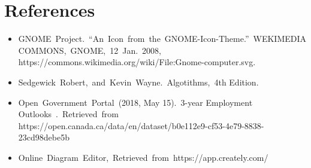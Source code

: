 \documentclass[12pt]{article}
\begin{document}
\section{References}
\begin{itemize}
\item GNOME\ Project.\ “An\ Icon\ from\ the\ GNOME-Icon-Theme.”\ WEKIMEDIA\\ COMMONS,\ GNOME,\ 12\ Jan.\ 2008, https://commons.wikimedia.org/wiki/File:Gnome-computer.svg.
\item Sedgewick\ Robert,\ and\ Kevin\ Wayne.\ Algotithms,\ 4th Edition.
\item Open\ Government\ Portal\ (2018, May 15).\ 3-year Employment Outlooks\ .\ Retrieved\ from
https://open.canada.ca/data/en/dataset/b0e112e9-cf53-4e79-8838-23cd98debe5b
\item Online\ Diagram\ Editor,\ Retrieved\ from\ https://app.creately.com/
\end{itemize}
\end{document}
